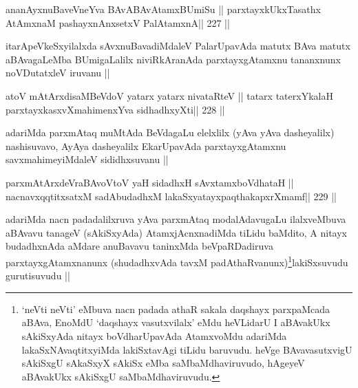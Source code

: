\begin{shl}
ananAyxnuBaveVneYva BAvABAvAtamxBUmiSu ||
parxtayxkUkxTasathx AtAmxnaM pashayxnAnxsetxV PalAtamxnA\hfill || 227 ||
\end{shl}

\begin{artha}
itarApeVkeSxyilalxda sAvxnuBavadiMdaleV PalarUpavAda matutx BAva
matutx aBAvagaLeMba BUmigaLalilx niviRkAranAda parxtayxgAtamxnu
tananxnunx noVDutatxleV iruvanu ||
\end{artha}


\begin{shl}
atoV mAtArxdisaMBeVdoV yatarx yatarx nivataRteV ||
tatarx \footnotemark[1]taterxYkalaH parxtayxkasxvXmahimenxYva sidhadhxyXti\hfill || 228 ||
\end{shl}

\begin{artha}
adariMda parxmAtaq muMtAda BeVdagaLu elelxlilx (yAva yAva dasheyalilx)
nashisuvavo, AyAya dasheyalilx EkarUpavAda parxtayxgAtamxnu
savxmahimeyiMdaleV sididhxsuvanu ||
\end{artha}


\begin{shl}
parxmAtArxdeVraBAvoV\s toV yaH sidadhxH sAvxtamxboVdhataH ||
nacnavxqqtitxsatxM sadAbudadhxM lakaSxyatayxpaqthakapxrXmamf\hfill || 229 ||
\end{shl}

\begin{artha}
adariMda nacn padadalilxruva yAva parxmAtaq modalAdavugaLu
ilalxveMbuva aBAvavu tanageV (sAkiSxyAda) AtamxjAcnxnadiMda tiLidu
baMdito, A nitayx budadhxnAda aMdare anuBavavu taninxMda
beVpaRDadiruva parxtayxgAtamxnanunx (shudadhxvAda
tavxM padAthaRvanunx)\footnote[1]{`neVti neVti' eMbuva nacn padada
  athaR sakala daqshayx parxpaMcada aBAva, EnoMdU `daqshayx
  vasutxvilalx' eMdu heVLidarU I aBAvakUkx sAkiSxyAda nitayx
  boVdharUpavAda AtamxvoMdu adariMda lakaSxNAvaqtitxyiMda lakiSxtavAgi
tiLidu baruvudu. heVge BAvavasutxvigU sAkiSxgU sAkaSxyX sAkiSx eMba
saMbaMdhaviruvudo, hAgeyeV aBAvakUkx sAkiSxgU saMbaMdhaviruvudu.}lakiSxsuvudu
gurutisuvudu ||
\end{artha}


